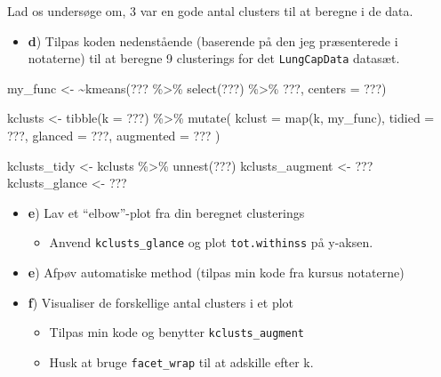 \documentclass[
]{book}
\newenvironment{Shaded}{\begin{snugshade}}{\end{snugshade}}
\newcommand{\AttributeTok}[1]{\textcolor[rgb]{0.77,0.63,0.00}{#1}}
\newcommand{\ErrorTok}[1]{\textcolor[rgb]{0.64,0.00,0.00}{\textbf{#1}}}
\newcommand{\FunctionTok}[1]{\textcolor[rgb]{0.00,0.00,0.00}{#1}}
\newcommand{\NormalTok}[1]{#1}
\newcommand{\OtherTok}[1]{\textcolor[rgb]{0.56,0.35,0.01}{#1}}
\newcommand{\SpecialCharTok}[1]{\textcolor[rgb]{0.00,0.00,0.00}{#1}}
\providecommand{\tightlist}{%
  \setlength{\itemsep}{0pt}\setlength{\parskip}{0pt}}
\begin{document}
Lad os undersøge om, 3 var en gode antal clusters til at beregne i de data.

\begin{itemize}
\tightlist
\item
  \textbf{d}) Tilpas koden nedenstående (baserende på den jeg præsenterede i notaterne) til at beregne 9 clusterings for det \texttt{LungCapData} datasæt.
\end{itemize}

\begin{Shaded}
\begin{Highlighting}[]
\NormalTok{my\_func }\OtherTok{\textless{}{-}} \ErrorTok{\textasciitilde{}}\FunctionTok{kmeans}\NormalTok{(??? }\SpecialCharTok{\%\textgreater{}\%} \FunctionTok{select}\NormalTok{(???) }\SpecialCharTok{\%\textgreater{}\%}\NormalTok{ ???,}
                 \AttributeTok{centers =}\NormalTok{ ???)  }

\NormalTok{kclusts }\OtherTok{\textless{}{-}} 
  \FunctionTok{tibble}\NormalTok{(}\AttributeTok{k =}\NormalTok{ ???) }\SpecialCharTok{\%\textgreater{}\%}
  \FunctionTok{mutate}\NormalTok{( }\AttributeTok{kclust =} \FunctionTok{map}\NormalTok{(k, my\_func),}
          \AttributeTok{tidied =}\NormalTok{ ???,}
          \AttributeTok{glanced =}\NormalTok{ ???,}
          \AttributeTok{augmented =}\NormalTok{ ???}
\NormalTok{        )}


\NormalTok{kclusts\_tidy    }\OtherTok{\textless{}{-}}\NormalTok{ kclusts }\SpecialCharTok{\%\textgreater{}\%} \FunctionTok{unnest}\NormalTok{(???)}
\NormalTok{kclusts\_augment }\OtherTok{\textless{}{-}}\NormalTok{ ??? }
\NormalTok{kclusts\_glance }\OtherTok{\textless{}{-}}\NormalTok{  ???}
\end{Highlighting}
\end{Shaded}

\begin{itemize}
\item
  \textbf{e}) Lav et ``elbow''-plot fra din beregnet clusterings

  \begin{itemize}
  \tightlist
  \item
    Anvend \texttt{kclusts\_glance} og plot \texttt{tot.withinss} på y-aksen.
  \end{itemize}
\item
  \textbf{e}) Afpøv automatiske method (tilpas min kode fra kursus notaterne)
\item
  \textbf{f}) Visualiser de forskellige antal clusters i et plot

  \begin{itemize}
  \tightlist
  \item
    Tilpas min kode og benytter \texttt{kclusts\_augment}
  \item
    Husk at bruge \texttt{facet\_wrap} til at adskille efter k.
  \end{itemize}
\end{itemize}
\end{document}
